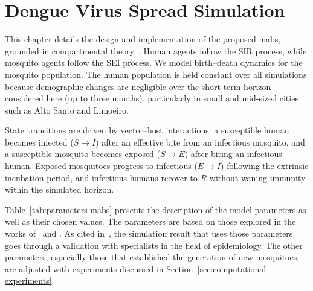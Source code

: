 \chapter{Dengue Virus Spread Simulation}\label{chp:dengue-virus-spread-simulation}

This chapter details the design and implementation of the proposed \gls{mabs}, grounded in compartmental theory~\citep{amaku:2014}. Human agents follow the SIR process, while mosquito agents follow the SEI process. We model birth–death dynamics for the mosquito population. The human population is held constant over all simulations because demographic changes are negligible over the short-term horizon considered here (up to three months), particularly in small and mid-sized cities such as Alto Santo and Limoeiro.

State transitions are driven by vector–host interactions: a susceptible human becomes infected ($S\!\to\!I$) after an effective bite from an infectious mosquito, and a susceptible mosquito becomes exposed ($S\!\to\!E$) after biting an infectious human. Exposed mosquitoes progress to infectious ($E\!\to\!I$) following the extrinsic incubation period, and infectious humans recover to $R$ without waning immunity within the simulated horizon.


Table~\ref{tab:parameters-mabs} presents the description of the model parameters as well as their chosen values. The parameters are based on those explored in the works of~\cite{da-silva:2020} and \cite{dwivedi:2022}. As cited in~\cite{da-silva:2020}, the simulation result that uses those parameters goes through a validation with specialists in the field of epidemiology. The other parameters, especially those that established the generation of new mosquitoes, are adjusted with experiments discussed in Section~\ref{sec:computational-experiments}.

